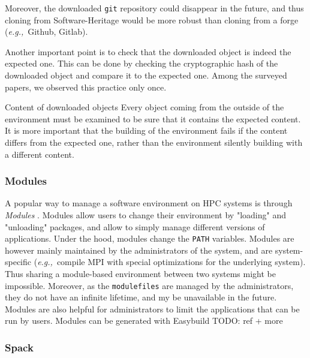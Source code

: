 \documentclass[sigconf]{acmart}
\newcommand{\eg}{\emph{e.g.,}}
\newcommand{\todo}[1]{{\color{red}TODO: #1}}
\begin{document}
Moreover, the downloaded \texttt{git} repository could disappear in the future, and thus cloning from Software-Heritage would be more robust than cloning from a forge (\eg\ Github, Gitlab).

Another important point is to check that the downloaded object is indeed the expected one.
This can be done by checking the cryptographic hash of the downloaded object and compare it to the expected one.
Among the surveyed papers, we observed this practice only once.

\begin{lesson}{Content of downloaded objects}{}
Every object coming from the outside of the environment must be examined to be sure that it contains the expected content. 
It is more important that the building of the environment fails if the content differs from the expected one, rather than the environment silently building with a different content.
\end{lesson}

\subsubsection{Modules}

A popular way to manage a software environment on HPC systems is through \emph{Modules} \cite{modules}.
Modules allow users to change their environment by "loading" and "unloading" packages, and allow to simply manage different versions of applications. 
Under the hood, modules change the \texttt{PATH} variables.
Modules are however mainly maintained by the administrators of the system, and are system-specific (\eg\ compile MPI with special optimizations for the underlying system).
Thus sharing a module-based environment between two systems might be impossible.
Moreover, as the \texttt{modulefiles} are managed by the administrators, they do not have an infinite lifetime, and my be unavailable in the future.
Modules are also helpful for administrators to limit the applications that can be run by users.
Modules can be generated with Easybuild \todo{ref + more}

\subsubsection{Spack}
\end{document}
